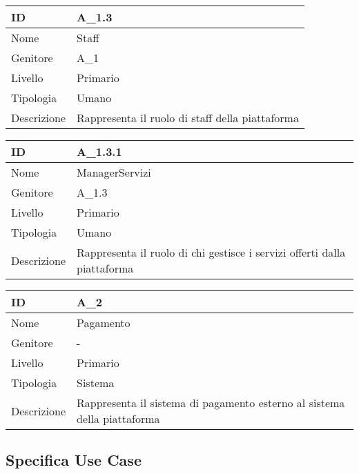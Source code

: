 \begin{center}
\begin{tabular}{ |p{2cm}|p{10cm}|  }
\hline
ID & A\_1.3 \\\hline
Nome & Staff\\\hline
Genitore & A\_1\\\hline
Livello &  Primario \\\hline
Tipologia & Umano \\\hline
Descrizione &  Rappresenta il ruolo di staff della piattaforma \\\hline
\end{tabular}
\label{table_attore:1.3}\newline

\begin{tabular}{ |p{2cm}|p{10cm}|  }
\hline
ID & A\_1.3.1 \\\hline
Nome & ManagerServizi\\\hline
Genitore & A\_1.3\\\hline
Livello &  Primario \\\hline
Tipologia & Umano \\\hline
Descrizione &  Rappresenta il ruolo di chi gestisce i servizi offerti dalla piattaforma \\\hline
\end{tabular}
\label{table_attore:1.3.1}\newline

\begin{tabular}{ |p{2cm}|p{10cm}|  }
\hline
ID & A\_2 \\\hline
Nome & Pagamento\\\hline
Genitore & - \\\hline
Livello &  Primario \\\hline
Tipologia & Sistema \\\hline
Descrizione &  Rappresenta il sistema di pagamento esterno al sistema della piattaforma \\\hline
\end{tabular}
\label{table_attore:2}\newline


\subsection{Specifica Use Case}


\end{center}

